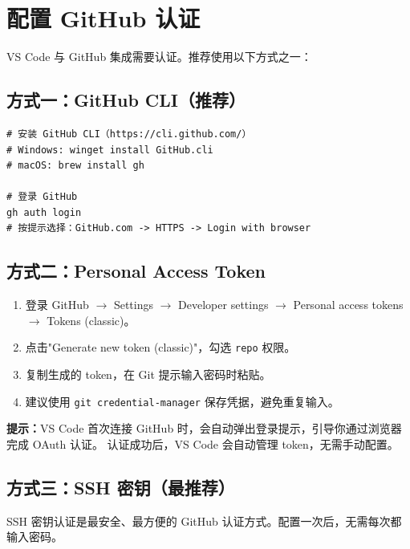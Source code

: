 \documentclass[12pt,a4paper,openany]{ctexbook}
\begin{document}
\section{配置 GitHub 认证}

VS Code 与 GitHub 集成需要认证。推荐使用以下方式之一：

\subsection{方式一：GitHub CLI（推荐）}

\begin{lstlisting}[style=shell]
# 安装 GitHub CLI（https://cli.github.com/）
# Windows: winget install GitHub.cli
# macOS: brew install gh

# 登录 GitHub
gh auth login
# 按提示选择：GitHub.com -> HTTPS -> Login with browser
\end{lstlisting}

\subsection{方式二：Personal Access Token}

\medskip
\begin{enumerate}[leftmargin=1.5em]
  \item 登录 GitHub $\to$ Settings $\to$ Developer settings $\to$
        Personal access tokens $\to$ Tokens (classic)。
  \item 点击"Generate new token (classic)"，勾选 \texttt{repo} 权限。
  \item 复制生成的 token，在 Git 提示输入密码时粘贴。
  \item 建议使用 \texttt{git credential-manager} 保存凭据，避免重复输入。
\end{enumerate}
\medskip

\medskip
\noindent\textbf{提示：}VS Code 首次连接 GitHub 时，会自动弹出登录提示，引导你通过浏览器完成 OAuth 认证。
认证成功后，VS Code 会自动管理 token，无需手动配置。
\medskip

\subsection{方式三：SSH 密钥（最推荐）}

SSH 密钥认证是最安全、最方便的 GitHub 认证方式。配置一次后，无需每次都输入密码。
\end{document}
